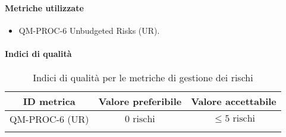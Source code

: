 		\paragraph{Metriche utilizzate}

			\begin{itemize}
				\item QM-PROC-6 Unbudgeted Risks (UR).
			\end{itemize}

		\paragraph{Indici di qualità}

			\begin{center}
				\begin{longtable}{|c|c|c|}
				\hline
				\rowcolor{lighter-grayer}
				\textbf{ID metrica} & \textbf{Valore preferibile} & \textbf{Valore accettabile}\\
				\hline
				\endfirsthead
				\hline
				QM-PROC-6 (UR) & \(0 \text{ rischi}\) & \(\le 5 \text{ rischi}\) \\
				\hline
				\caption{Indici di qualità per le metriche di gestione dei rischi}
				\end{longtable}
			\end{center}

